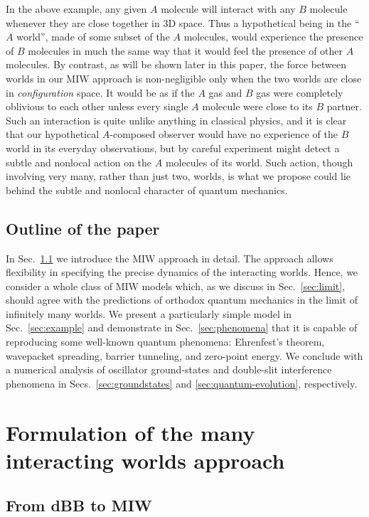 \documentclass[twocolumn,aps,pra,amsmath,amssymb,superscriptaddress]{revtex4}
\renewcommand{\(}{\left(}
\renewcommand{\)}{\right)}
\newcommand{\blk}{\color{black}}
\begin{document}
 In the above example, any given $A$ molecule 
will interact with any $B$ molecule whenever they are close together in 
3D space. Thus a hypothetical being in the ``$A$ world'', 
made of some subset of the $A$ molecules, 
would experience the presence of $B$ molecules in much the same way that it would
feel the presence of other $A$ molecules.  By contrast, as will be shown later in this 
paper, the force between worlds in our MIW approach is non-negligible only when the 
two worlds are close in {\em configuration} space. It would be as if the $A$ gas 
and $B$ gas were completely oblivious to each other unless every single $A$ molecule 
were close to its $B$ partner. Such an interaction is quite unlike anything in classical 
physics, and it is clear that our hypothetical $A$-composed observer would have no 
experience of the $B$ world in its everyday observations, but by careful experiment 
might detect a subtle and nonlocal action on the $A$ molecules of its world. 
Such action, though involving very many, rather than just two, worlds, is what we propose could 
lie behind the subtle and nonlocal character of quantum mechanics. \blk

\subsection{Outline of the paper}

In Sec.~\ref{sec:MIW} we introduce the MIW approach in detail.  
The approach allows flexibility in specifying the precise dynamics of the interacting worlds. Hence,
we consider 
a whole class of MIW models which, as we discuss in Sec.~\ref{sec:limit},
should \blk agree with the predictions of orthodox \blk quantum mechanics in the
limit of infinitely many worlds.  We present a particularly simple model \blk in
Sec.~\ref{sec:example} and demonstrate in Sec.~\ref{sec:phenomena} that it is
capable of reproducing some \blk well-known quantum phenomena: Ehrenfest's \blk
theorem, wavepacket spreading, barrier tunneling, and zero-point energy. We
conclude with a numerical analysis of oscillator ground-states and double-slit
interference phenomena in Secs.~\ref{sec:groundstates} \blk and
\ref{sec:quantum-evolution}, respectively.\blk

\section{Formulation of the many interacting worlds approach}

\subsection{From dBB to MIW}\label{sec:MIW}
\end{document}
